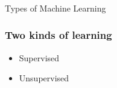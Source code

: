%





\begin{frame}[fragile]\frametitle{}
\begin{center}
{\Large Types of Machine Learning}
\end{center}
\end{frame}


\begin{frame}[fragile]\frametitle{Two kinds of learning}
\begin{itemize}
\item Supervised
\item Unsupervised
\end{itemize}
\end{frame}



